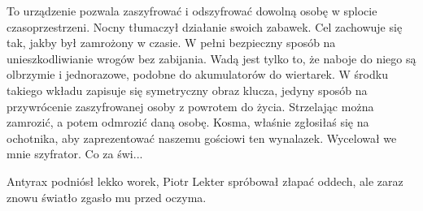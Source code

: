 \begin{dialogue}
\ds{} To urządzenie pozwala zaszyfrować i odszyfrować dowolną osobę w splocie czasoprzestrzeni. \dm{} Nocny tłumaczył działanie swoich zabawek. \dm{}
Cel zachowuje się tak, jakby był zamrożony w czasie.
W pełni bezpieczny sposób na unieszkodliwianie wrogów bez zabijania.
Wadą jest tylko to, że naboje do niego są olbrzymie i jednorazowe, podobne do akumulatorów do wiertarek.
W środku takiego wkładu zapisuje się symetryczny obraz klucza, jedyny sposób na przywrócenie zaszyfrowanej osoby z powrotem do życia.
Strzelając można zamrozić, a potem odmrozić daną osobę.
Kosma, właśnie zgłosiłaś się na ochotnika, aby zaprezentować naszemu gościowi ten wynalazek. \dm{} Wycelował we mnie szyfrator. Co za świ...
\end{dialogue}

\divider{}

Antyrax podniósł lekko worek, Piotr Lekter spróbował złapać oddech, ale zaraz znowu światło zgasło mu przed oczyma.

\divider{}


